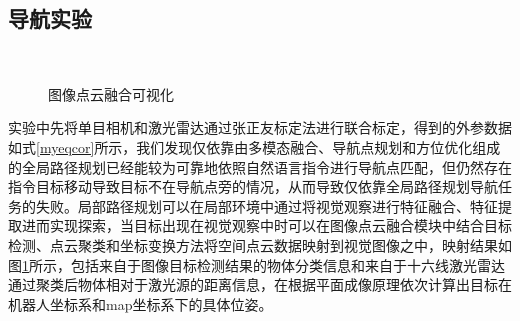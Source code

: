 \subsection{导航实验}
\begin{figure}[h]
    \centering
    \\
    \caption{图像点云融合可视化}
    \label{myfusion}
\end{figure}
实验中先将单目相机和激光雷达通过张正友标定法进行联合标定，得到的外参数据如式\ref{myeqcor}所示，我们发现仅依靠由多模态融合、导航点规划和方位优化组成的全局路径规划已经能较为可靠地依照自然语言指令进行导航点匹配，但仍然存在指令目标移动导致目标不在导航点旁的情况，从而导致仅依靠全局路径规划导航任务的失败。局部路径规划可以在局部环境中通过将视觉观察进行特征融合、特征提取进而实现探索，当目标出现在视觉观察中时可以在图像点云融合模块中结合目标检测、点云聚类和坐标变换方法将空间点云数据映射到视觉图像之中，映射结果如图\ref{myfusion}所示，包括来自于图像目标检测结果的物体分类信息和来自于十六线激光雷达通过聚类后物体相对于激光源的距离信息，在根据平面成像原理依次计算出目标在机器人坐标系和map坐标系下的具体位姿。

